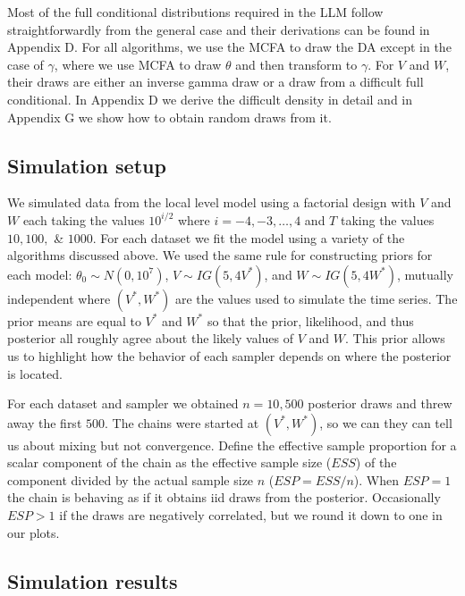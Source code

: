 \documentclass[12pt]{article}
\begin{document}
Most of the full conditional distributions required in the LLM follow straightforwardly from the general case and their derivations can be found in Appendix D. For all algorithms, we use the MCFA to draw the DA except in the case of $\gamma$, where we use MCFA to draw $\theta$ and then transform to $\gamma$. For $V$ and $W$, their draws are either an inverse gamma draw or a draw from a difficult full conditional. In Appendix D we derive the difficult density in detail and in Appendix G we show how to obtain random draws from it.

\subsection{Simulation setup}

We simulated data from the local level model using a factorial design with $V$ and $W$ each taking the values $10^{i/2}$ where $i=-4,-3,\dots,4$ and $T$ taking the values $10, 100,$ \& $1000$. For each dataset we fit the model using a variety of the algorithms discussed above. We used the same rule for constructing priors for each model: $\theta_0\sim N(0,10^7)$, $V\sim IG(5, 4V^*)$, and $W\sim IG(5, 4W^*)$, mutually independent where $(V^*,W^*)$ are the values used to simulate the time series. The prior means are equal to $V^*$ and $W^*$ so that the prior, likelihood, and thus posterior all roughly agree about the likely values of $V$ and $W$.  This prior allows us to highlight how the behavior of each sampler depends on where the posterior is located.

For each dataset and sampler we obtained $n=10,500$ posterior draws and threw away the first $500$. The chains were started at $(V^*, W^*)$, so we can they can tell us about mixing but not convergence. Define the effective sample proportion for a scalar component of the chain as the effective sample size ($ESS$) \citep{gelman2013bayesian} of the component divided by the actual sample size $n$ ($ESP=ESS/n$). When $ESP=1$ the chain is behaving as if it obtains iid draws from the posterior. Occasionally $ESP>1$ if the draws are negatively correlated, but we round it down to one in our plots.

\subsection{Simulation results}
\end{document}
